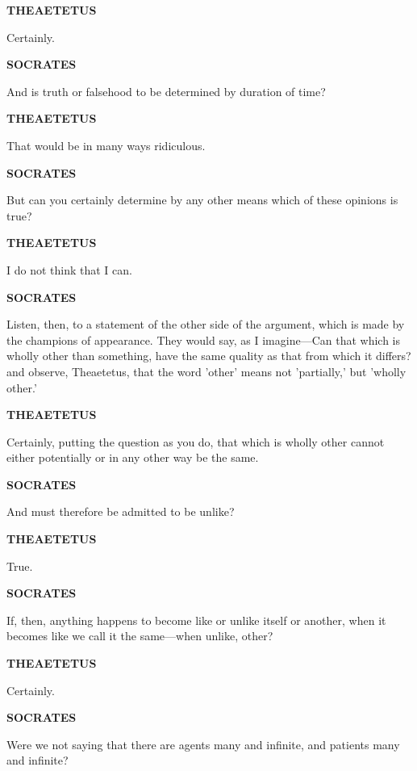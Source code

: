 \documentclass[11pt,letter]{article}
\begin{document}
\par \textbf{THEAETETUS}
\par   Certainly.

\par \textbf{SOCRATES}
\par   And is truth or falsehood to be determined by duration of time?

\par \textbf{THEAETETUS}
\par   That would be in many ways ridiculous.

\par \textbf{SOCRATES}
\par   But can you certainly determine by any other means which of these opinions is true?

\par \textbf{THEAETETUS}
\par   I do not think that I can.

\par \textbf{SOCRATES}
\par   Listen, then, to a statement of the other side of the argument, which is made by the champions of appearance. They would say, as I imagine—Can that which is wholly other than something, have the same quality as that from which it differs? and observe, Theaetetus, that the word 'other' means not 'partially,' but 'wholly other.'

\par \textbf{THEAETETUS}
\par   Certainly, putting the question as you do, that which is wholly other cannot either potentially or in any other way be the same.

\par \textbf{SOCRATES}
\par   And must therefore be admitted to be unlike?

\par \textbf{THEAETETUS}
\par   True.

\par \textbf{SOCRATES}
\par   If, then, anything happens to become like or unlike itself or another, when it becomes like we call it the same—when unlike, other?

\par \textbf{THEAETETUS}
\par   Certainly.

\par \textbf{SOCRATES}
\par   Were we not saying that there are agents many and infinite, and patients many and infinite?
\end{document}
